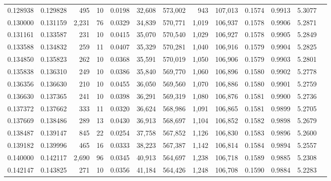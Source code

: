 \begin{tabular}{rrrrrrrrrrrrr}
0.128938 & 0.129828 &   495 &  10 &                                     0.0198 &  32,608 & 573,002 &     943 & 107,013 & 0.1574 & 0.9913 & 5.3077 \\
0.130000 & 0.131159 & 2,231 &  76 &                                     0.0329 &  34,839 & 570,771 &   1,019 & 106,937 & 0.1578 & 0.9906 & 5.2871 \\
0.131161 & 0.133587 &   231 &  10 &                                     0.0415 &  35,070 & 570,540 &   1,029 & 106,927 & 0.1578 & 0.9905 & 5.2849 \\
0.133588 & 0.134832 &   259 &  11 &                                     0.0407 &  35,329 & 570,281 &   1,040 & 106,916 & 0.1579 & 0.9904 & 5.2825 \\
0.134850 & 0.135823 &   262 &  10 &                                     0.0368 &  35,591 & 570,019 &   1,050 & 106,906 & 0.1579 & 0.9903 & 5.2801 \\
0.135838 & 0.136310 &   249 &  10 &                                     0.0386 &  35,840 & 569,770 &   1,060 & 106,896 & 0.1580 & 0.9902 & 5.2778 \\
0.136356 & 0.136630 &   210 &  10 &                                     0.0455 &  36,050 & 569,560 &   1,070 & 106,886 & 0.1580 & 0.9901 & 5.2759 \\
0.136630 & 0.137365 &   241 &  10 &                                     0.0398 &  36,291 & 569,319 &   1,080 & 106,876 & 0.1581 & 0.9900 & 5.2736 \\
0.137372 & 0.137662 &   333 &  11 &                                     0.0320 &  36,624 & 568,986 &   1,091 & 106,865 & 0.1581 & 0.9899 & 5.2705 \\
0.137669 & 0.138486 &   289 &  13 &                                     0.0430 &  36,913 & 568,697 &   1,104 & 106,852 & 0.1582 & 0.9898 & 5.2679 \\
0.138487 & 0.139147 &   845 &  22 &                                     0.0254 &  37,758 & 567,852 &   1,126 & 106,830 & 0.1583 & 0.9896 & 5.2600 \\
0.139182 & 0.139996 &   465 &  16 &                                     0.0333 &  38,223 & 567,387 &   1,142 & 106,814 & 0.1584 & 0.9894 & 5.2557 \\
0.140000 & 0.142117 & 2,690 &  96 &                                     0.0345 &  40,913 & 564,697 &   1,238 & 106,718 & 0.1589 & 0.9885 & 5.2308 \\
0.142147 & 0.143825 &   271 &  10 &                                     0.0356 &  41,184 & 564,426 &   1,248 & 106,708 & 0.1590 & 0.9884 & 5.2283 \\

\end{tabular}
